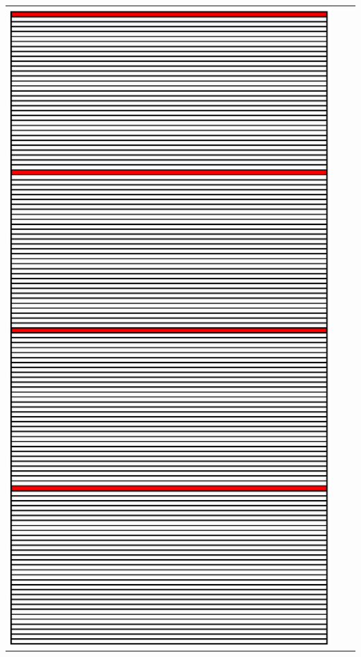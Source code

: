 \documentclass[xcolor={dvipsnames,svgnames},hyperref=dvips]{beamer}
\begin{document}
\begin{frame}
\begin{tabular}{c c c}
		\protect \includegraphics[scale=0.30]{images/fingerprint_xfs.ps} &

\end{tabular}
\end{frame}
\end{document}
